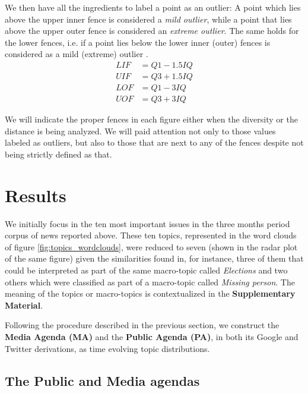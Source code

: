 \documentclass{bmcart}
\begin{document}
We then have all the ingredients to label a point as an outlier: A point which lies above the upper inner fence is considered a \emph{mild outlier}, while a point that lies above the upper outer fence is considered an \emph{extreme outlier}. The same holds for the lower fences, i.e. if a point lies below the lower inner (outer) fences is considered as a mild (extreme) outlier \cite{natrella2010nist}. 
\begin{eqnarray}\label{eq:fences}
LIF & = Q1 - 1.5 IQ \nonumber \\
UIF & = Q3 + 1.5 IQ \nonumber\\
LOF & = Q1 - 3 IQ \nonumber \\
UOF & = Q3 + 3 IQ
\end{eqnarray}
\par We will indicate the proper fences in each figure either when the diversity or the distance is being analyzed. We will paid attention not only to those values labeled as outliers, but also to those that are next to any of the fences despite not being strictly defined as that.

\section*{Results}
\label{results}

\par We initially focus in the ten most important issues in the three months period corpus of news reported above. These ten topics, represented in the word clouds of figure \ref{fig:topics_wordclouds}, were reduced to seven (shown in the radar plot of the same figure) given the similarities found in, for instance, three of them that could be interpreted as part of the same macro-topic called \emph{Elections} and two others which were classified as part of a macro-topic called \emph{Missing person}. The meaning of the topics or macro-topics is contextualized in the \textbf{Supplementary Material}. 
\par Following the procedure described in the previous section, we construct the \textbf{Media Agenda (MA)} and the \textbf{Public Agenda (PA)}, in both its Google and Twitter derivations, as time evolving topic distributions. 

\subsection*{The Public and Media agendas}
\end{document}
